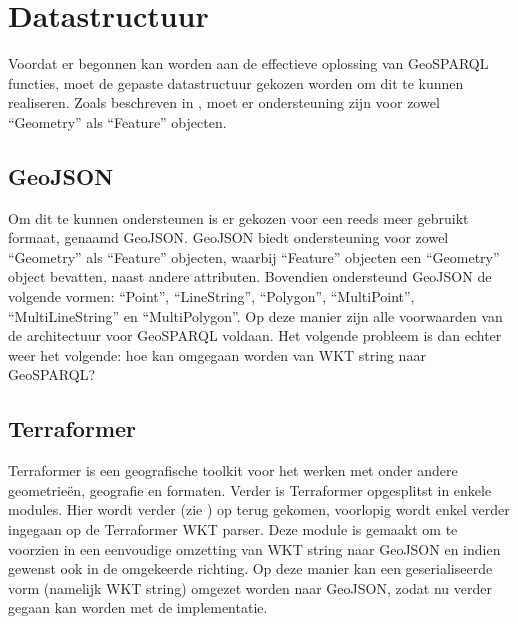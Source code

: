 \section{Datastructuur}
Voordat er begonnen kan worden aan de effectieve oplossing van GeoSPARQL functies, moet de gepaste datastructuur gekozen worden om dit te kunnen realiseren. Zoals beschreven in , moet er ondersteuning zijn voor zowel ``Geometry'' als ``Feature'' objecten. 

\subsection{GeoJSON}
Om dit te kunnen ondersteunen is er gekozen voor een reeds meer gebruikt formaat, genaamd GeoJSON. GeoJSON biedt ondersteuning voor zowel ``Geometry'' als ``Feature'' objecten, waarbij ``Feature'' objecten een ``Geometry'' object bevatten, naast andere attributen. Bovendien ondersteund GeoJSON de volgende vormen: ``Point'', ``LineString'', ``Polygon'', ``MultiPoint'', ``MultiLineString'' en ``MultiPolygon''. Op deze manier zijn alle voorwaarden van de architectuur voor GeoSPARQL voldaan. Het volgende probleem is dan echter weer het volgende: hoe kan omgegaan worden van WKT string naar GeoSPARQL?

\subsection{Terraformer}
Terraformer is een geografische toolkit voor het werken met onder andere geometrieën, geografie en formaten. Verder is Terraformer opgesplitst in enkele modules. Hier wordt verder (zie ) op terug gekomen, voorlopig wordt enkel verder ingegaan op de Terraformer WKT parser. Deze module is gemaakt om te voorzien in een eenvoudige omzetting van WKT string naar GeoJSON en indien gewenst ook in de omgekeerde richting. Op deze manier kan een geserialiseerde vorm (namelijk WKT string) omgezet worden naar GeoJSON, zodat nu verder gegaan kan worden met de implementatie. 



